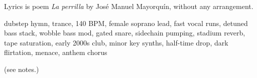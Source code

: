 

\begin{notes}
Lyrics is poem \emph{La perrilla} by José Manuel Mayorquín, without any arrangement.
\end{notes}

\begin{style}
dubstep hymn, trance, 140 BPM, female soprano lead, fast vocal runs, detuned bass stack, wobble bass mod, gated snare, sidechain pumping, stadium reverb, tape saturation, early 2000s club, minor key synths, half-time drop, dark flirtation, menace, anthem chorus
\end{style}

\begin{lyrics}
(see notes.)

\end{lyrics}

